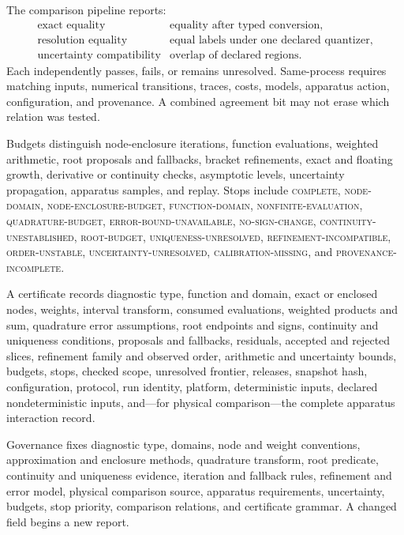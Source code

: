 The comparison pipeline reports:
\[
\begin{array}{ll}
\text{exact equality}&\text{equality after typed conversion},\\
\text{resolution equality}&\text{equal labels under one declared quantizer},\\
\text{uncertainty compatibility}&\text{overlap of declared regions}.
\end{array}
\]
Each independently passes, fails, or remains unresolved.  Same-process requires matching inputs, numerical
transitions, traces, costs, models, apparatus action, configuration, and provenance.  A combined agreement bit may
not erase which relation was tested.

Budgets distinguish node-enclosure iterations, function evaluations, weighted arithmetic, root proposals and
fallbacks, bracket refinements, exact and floating growth, derivative or continuity checks, asymptotic levels,
uncertainty propagation, apparatus samples, and replay.  Stops include \textsc{complete},
\textsc{node-domain}, \textsc{node-enclosure-budget}, \textsc{function-domain},
\textsc{nonfinite-evaluation}, \textsc{quadrature-budget}, \textsc{error-bound-unavailable},
\textsc{no-sign-change}, \textsc{continuity-unestablished}, \textsc{root-budget},
\textsc{uniqueness-unresolved}, \textsc{refinement-incompatible}, \textsc{order-unstable},
\textsc{uncertainty-unresolved}, \textsc{calibration-missing}, and \textsc{provenance-incomplete}.

A certificate records diagnostic type, function and domain, exact or enclosed nodes, weights, interval transform,
consumed evaluations, weighted products and sum, quadrature error assumptions, root endpoints and signs, continuity
and uniqueness conditions, proposals and fallbacks, residuals, accepted and rejected slices, refinement family and
observed order, arithmetic and uncertainty bounds, budgets, stops, checked scope, unresolved frontier, releases,
snapshot hash, configuration, protocol, run identity, platform, deterministic inputs, declared nondeterministic
inputs, and---for physical comparison---the complete apparatus interaction record.

Governance fixes diagnostic type, domains, node and weight conventions, approximation and enclosure methods,
quadrature transform, root predicate, continuity and uniqueness evidence, iteration and fallback rules, refinement
and error model, physical comparison source, apparatus requirements, uncertainty, budgets, stop priority, comparison
relations, and certificate grammar.  A changed field begins a new report.


